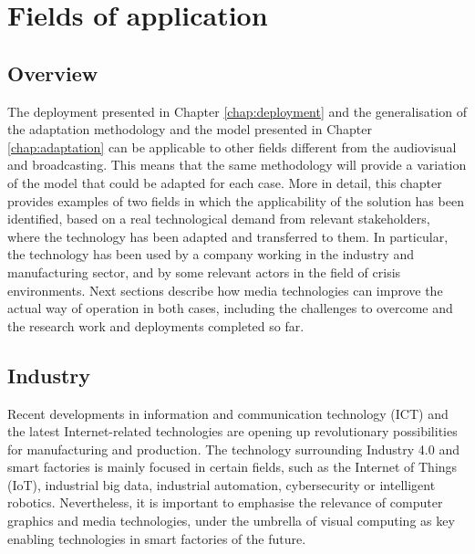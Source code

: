 \chapter{Fields of application}
\label{chap:fields}

\section{Overview}
The deployment presented in Chapter \ref{chap:deployment} and the generalisation of the adaptation methodology and the model presented in Chapter \ref{chap:adaptation} can be applicable to other fields different from the audiovisual and broadcasting. This means that the same methodology will provide a variation of the model that could be adapted for each case. More in detail, this chapter provides examples of two fields in which the applicability of the solution has been identified, based on a real technological demand from relevant stakeholders, where the technology has been adapted and transferred to them. In particular, the technology has been used by a company working in the industry and manufacturing sector, and by some relevant actors in the field of crisis environments. Next sections describe how media technologies can improve the actual way of operation in both cases, including the challenges to overcome and the research work and deployments completed so far. 

\section{Industry}
Recent developments in information and communication technology (ICT) and the latest Internet-related technologies are opening up revolutionary possibilities for manufacturing and production. The technology surrounding Industry 4.0 and smart factories is mainly focused in certain fields, such as the Internet of Things (IoT), industrial big data, industrial automation, cybersecurity or intelligent robotics. Nevertheless, it is important to emphasise the relevance of computer graphics and media technologies, under the
umbrella of visual computing as key enabling technologies in smart factories of the future.

